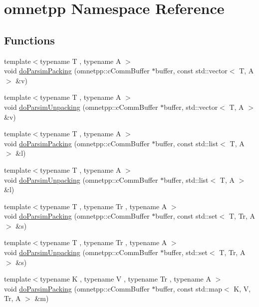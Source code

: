 \hypertarget{namespaceomnetpp}{}\section{omnetpp Namespace Reference}
\label{namespaceomnetpp}
\subsection*{Functions}
\begin{DoxyCompactItemize}
\item 
{\footnotesize template$<$typename T , typename A $>$ }\\void \hyperlink{namespaceomnetpp_aa55507da29724bc32cb1377349b22c87}{do\+Parsim\+Packing} (omnetpp\+::c\+Comm\+Buffer $\ast$buffer, const std\+::vector$<$ T, A $>$ \&v)
\item 
{\footnotesize template$<$typename T , typename A $>$ }\\void \hyperlink{namespaceomnetpp_a5d85de2bce765edaa5f7b1651f94f37c}{do\+Parsim\+Unpacking} (omnetpp\+::c\+Comm\+Buffer $\ast$buffer, std\+::vector$<$ T, A $>$ \&v)
\item 
{\footnotesize template$<$typename T , typename A $>$ }\\void \hyperlink{namespaceomnetpp_a1043d9829c084411066b9e9469d75942}{do\+Parsim\+Packing} (omnetpp\+::c\+Comm\+Buffer $\ast$buffer, const std\+::list$<$ T, A $>$ \&l)
\item 
{\footnotesize template$<$typename T , typename A $>$ }\\void \hyperlink{namespaceomnetpp_a28632f95fc2029c95828ed30e379f9ee}{do\+Parsim\+Unpacking} (omnetpp\+::c\+Comm\+Buffer $\ast$buffer, std\+::list$<$ T, A $>$ \&l)
\item 
{\footnotesize template$<$typename T , typename Tr , typename A $>$ }\\void \hyperlink{namespaceomnetpp_a44c0e632aecd37f539392e96147deef0}{do\+Parsim\+Packing} (omnetpp\+::c\+Comm\+Buffer $\ast$buffer, const std\+::set$<$ T, Tr, A $>$ \&s)
\item 
{\footnotesize template$<$typename T , typename Tr , typename A $>$ }\\void \hyperlink{namespaceomnetpp_a8ae2ca4f89c4d2f8a95512b5b2936c79}{do\+Parsim\+Unpacking} (omnetpp\+::c\+Comm\+Buffer $\ast$buffer, std\+::set$<$ T, Tr, A $>$ \&s)
\item 
{\footnotesize template$<$typename K , typename V , typename Tr , typename A $>$ }\\void \hyperlink{namespaceomnetpp_ae14adea382a91da2e1157d74981a946b}{do\+Parsim\+Packing} (omnetpp\+::c\+Comm\+Buffer $\ast$buffer, const std\+::map$<$ K, V, Tr, A $>$ \&m)

\end{DoxyCompactItemize}
